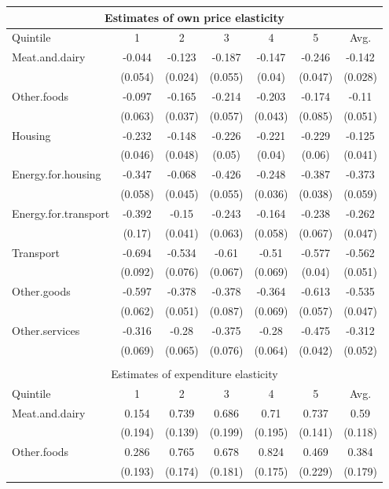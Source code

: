\begin{tabular}{lcccccc}
\multicolumn{7}{c}{Estimates of own price elasticity} \\ 
  \hline
Quintile & 1 & 2 & 3 & 4 & 5 & Avg. \\ 
  \hline
Meat.and.dairy & -0.044 & -0.123 & -0.187 & -0.147 & -0.246 & -0.142 \\ 
   & (0.054) & (0.024) & (0.055) & (0.04) & (0.047) & (0.028) \\ 
  Other.foods & -0.097 & -0.165 & -0.214 & -0.203 & -0.174 & -0.11 \\ 
   & (0.063) & (0.037) & (0.057) & (0.043) & (0.085) & (0.051) \\ 
  Housing & -0.232 & -0.148 & -0.226 & -0.221 & -0.229 & -0.125 \\ 
   & (0.046) & (0.048) & (0.05) & (0.04) & (0.06) & (0.041) \\ 
  Energy.for.housing & -0.347 & -0.068 & -0.426 & -0.248 & -0.387 & -0.373 \\ 
   & (0.058) & (0.045) & (0.055) & (0.036) & (0.038) & (0.059) \\ 
  Energy.for.transport & -0.392 & -0.15 & -0.243 & -0.164 & -0.238 & -0.262 \\ 
   & (0.17) & (0.041) & (0.063) & (0.058) & (0.067) & (0.047) \\ 
  Transport & -0.694 & -0.534 & -0.61 & -0.51 & -0.577 & -0.562 \\ 
  & (0.092) & (0.076) & (0.067) & (0.069) & (0.04) & (0.051) \\ 
  Other.goods & -0.597 & -0.378 & -0.378 & -0.364 & -0.613 & -0.535 \\ 
   & (0.062) & (0.051) & (0.087) & (0.069) & (0.057) & (0.047) \\ 
  Other.services & -0.316 & -0.28 & -0.375 & -0.28 & -0.475 & -0.312 \\ 
   & (0.069) & (0.065) & (0.076) & (0.064) & (0.042) & (0.052) \\ 
   \hline\\
\multicolumn{7}{c}{Estimates of expenditure elasticity} \\ 
   \hline
Quintile & 1 & 2 & 3 & 4 & 5 & Avg. \\ 
  \hline
Meat.and.dairy & 0.154 & 0.739 & 0.686 & 0.71 & 0.737 & 0.59 \\ 
   & (0.194) & (0.139) & (0.199) & (0.195) & (0.141) & (0.118) \\ 
  Other.foods & 0.286 & 0.765 & 0.678 & 0.824 & 0.469 & 0.384 \\ 
   & (0.193) & (0.174) & (0.181) & (0.175) & (0.229) & (0.179) \\ 

\end{tabular}
